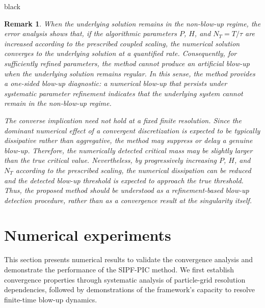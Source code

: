 \documentclass[review,onefignum,onetabnum]{siamart250211}
\newtheorem{remark}[theorem]{Remark}
\begin{document}
\begin{color}{black}
\begin{remark}
\label{remark:blowup}
When the underlying solution remains in the non-blow-up regime, the error analysis shows that, if the algorithmic parameters $P$, $H$, and $N_T=T/\tau$ are increased according to the prescribed coupled scaling, the numerical solution converges to the underlying solution at a quantified rate. Consequently, for sufficiently refined parameters, the method cannot produce an artificial blow-up when the underlying solution remains regular. In this sense, the method provides a one-sided blow-up diagnostic: a numerical blow-up that persists under systematic parameter refinement indicates that the underlying system cannot remain in the non-blow-up regime.

The converse implication need not hold at a fixed finite resolution. Since the dominant numerical effect of a convergent discretization is expected to be typically dissipative rather than aggregative, the method may suppress or delay a genuine blow-up. Therefore, the numerically detected critical mass may be slightly larger than the true critical value. Nevertheless, by progressively increasing $P$, $H$, and $N_T$ according to the prescribed scaling, the numerical dissipation can be reduced and the detected blow-up threshold is expected to approach the true threshold. Thus, the proposed method should be understood as a refinement-based blow-up detection procedure, rather than as a convergence result at the singularity itself.
\end{remark}
\end{color}

\section{Numerical experiments}
\label{sec:Num}
This section presents numerical results to validate the convergence analysis and demonstrate the performance of the SIPF-PIC method. We first establish convergence properties through systematic analysis of particle-grid resolution dependencies, followed by demonstrations of the framework's capacity to resolve finite-time blow-up dynamics.
\end{document}
